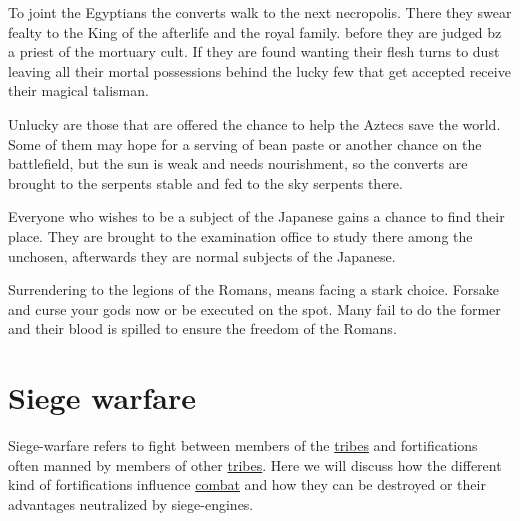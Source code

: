 To joint the \gls{Egyptians} the converts walk to the next necropolis.
There they swear fealty to the King of the afterlife and the royal family.
before they are judged bz a priest of the mortuary cult.
If they are found wanting their flesh turns to dust leaving all their mortal possessions behind
the lucky few that get accepted receive their magical talisman.

Unlucky are those that are offered the chance to help the \gls{Aztecs} save the world.
Some of them may hope for a serving of bean paste or another chance on the battlefield,
but the sun is weak and needs nourishment,
so the converts are brought to the serpents stable and fed to the sky serpents there.

Everyone who wishes to be a subject of the \gls{Japanese} gains a chance to find their place.
They are brought to the examination office to study there among the unchosen,
afterwards they are normal subjects of the \gls{Japanese}.

Surrendering to the legions of the \gls{Romans}, means facing a stark choice.
Forsake and curse your gods now or be executed on the spot.
Many fail to do the former and their blood is spilled to ensure the freedom of the \gls{Romans}.

\section{Siege warfare}\label{ch:Conflict:Sieges}

Siege-warfare refers to fight between members of the
\hyperref[ch:Tribes]{tribes} and fortifications often manned by members of
other \hyperref[ch:Tribes]{tribes}. Here we will discuss how the different kind
of fortifications influence \hyperref[ch:Conflict:Combat]{combat} and how they
can be destroyed or their advantages neutralized by siege-engines.
